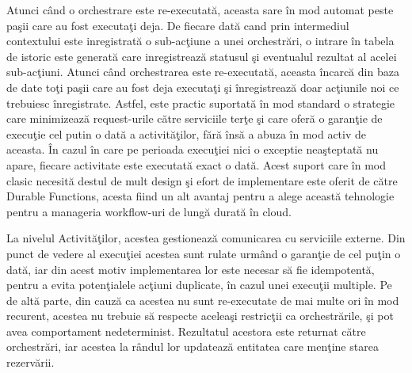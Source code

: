 \par Atunci când o orchestrare este re-executată, aceasta sare în mod automat peste paşii care au fost executaţi deja. De fiecare dată cand prin intermediul contextului este inregistrată o sub-acţiune a unei orchestrări, o intrare în tabela de istoric este generată care inregistrează statusul şi eventualul rezultat al acelei sub-acţiuni. Atunci când orchestrarea este re-executată, aceasta încarcă din baza de date toţi paşii care au fost deja executaţi şi înregistrează doar acţiunile noi ce trebuiesc înregistrate. Astfel, este practic suportată în mod standard o strategie care minimizează request-urile către serviciile terţe şi care oferă o garanţie de execuţie cel putin o dată a activităţilor, fără însă a abuza în mod activ de aceasta. În cazul în care pe perioada execuţiei nici o exceptie neaşteptată nu apare, fiecare activitate este executată exact o dată. Acest suport care în mod clasic necesită destul de mult design şi efort de implementare este oferit de către Durable Functions, acesta fiind un alt avantaj pentru a alege această tehnologie pentru a manageria workflow-uri de lungă durată în cloud. 
\par La nivelul Activităţilor, acestea gestionează comunicarea cu serviciile externe. Din punct de vedere al execuţiei acestea sunt rulate urmând o garanţie de cel puţin o dată, iar din acest motiv implementarea lor este necesar să fie idempotentă, pentru a evita potenţialele acţiuni duplicate, în cazul unei execuţii multiple. Pe de altă parte, din cauză ca acestea nu sunt re-executate de mai multe ori în mod recurent, acestea nu trebuie să respecte aceleaşi restricţii ca orchestrările, şi pot avea comportament nedeterminist. Rezultatul acestora este returnat către orchestrări, iar acestea la rândul lor updatează entitatea care menţine starea rezervării. 
